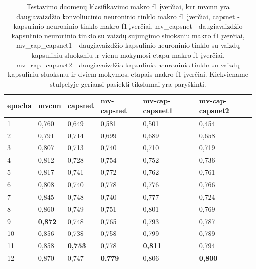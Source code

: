 \begin{table}[]
	\caption{
		Testavimo duomenų klasifikavimo makro f1 įverčiai, kur mvcnn yra daugiavaizdžio konvoliucinio neuroninio tinklo makro f1 įverčiai, capsnet - kapsulinio neuroninio tinklo makro f1 įverčiai, mv\_capsnet - daugiavaizdžio kapsulinio neuroninio tinklo su vaizdų sujungimo sluoksniu makro f1 įverčiai, mv\_cap\_capsnet1 - daugiavaizdžio kapsulinio neuroninio tinklo su vaizdų kapsuliniu sluoksniu ir vienu mokymosi etapu makro f1 įverčiai, mv\_cap\_capsnet2 - daugiavaizdžio kapsulinio neuroninio tinklo su vaizdų kapsuliniu sluoksniu ir dviem mokymosi etapais makro f1 įverčiai. Kiekviename stulpelyje geriausi pasiekti tikslumai yra paryškinti.
	}
	\begin{tabular}{l|l|l|l|l|l}
		epocha & mvcnn & capsnet & mv-capsnet & mv-cap-capsnet1 & mv-cap-capsnet2 \\
		\hline
		1 & 0,760 &   0,649 &      0,581 &           0,501 &           0,454 \\
		2 & 0,791 &   0,714 &      0,699 &           0,689 &           0,658 \\
		3 & 0,807 &   0,713 &      0,740 &           0,710 &           0,719 \\
		4 & 0,812 &   0,728 &      0,754 &           0,752 &           0,736 \\
		5 & 0,817 &   0,741 &      0,772 &           0,762 &           0,761 \\
		6 & 0,808 &   0,740 &      0,778 &           0,776 &           0,766 \\
		7 & 0,845 &   0,748 &      0,740 &           0,777 &           0,724 \\
		8 & 0,860 &   0,749 &      0,751 &           0,801 &           0,769 \\
		9 & \textbf{0,872} &   0,748 &      0,765 &           0,793 &           0,787 \\
		10 & 0,856 &   0,738 &      0,758 &           0,799 &           0,789 \\
		11 & 0,858 &   \textbf{0,753} &      0,778 &           \textbf{0,811} &           0,794 \\
		12 & 0,870 &   0,747 &      \textbf{0,779} &           0,806 &           \textbf{0,800} \\
	\end{tabular}
	\label{tbl:macro_f1}
\end{table}


